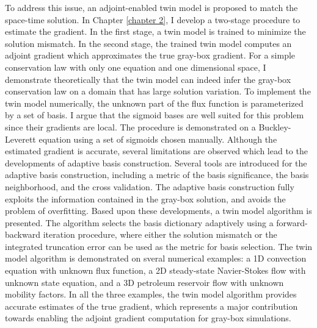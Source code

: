 To address this issue, an adjoint-enabled twin model is proposed 
to match the space-time solution.
In Chapter \ref{chapter 2}, I develop a two-stage procedure to estimate the gradient.
In the first stage, a twin model is trained to minimize the solution mismatch.
In the second stage, the trained twin model
computes an adjoint gradient which approximates the true gray-box gradient.
For a simple conservation law with only one equation and one dimensional space,
I demonstrate theoretically that the twin model can indeed infer the gray-box 
conservation law on a domain that has large solution variation.
To implement the twin model numerically,
the unknown part of the flux function is parameterized by a set of basis.
I argue that the sigmoid bases are well suited for this problem since
their gradients are local. The procedure is demonstrated
on a Buckley-Leverett equation using a set of sigmoids chosen manually.
Although the estimated gradient is accurate, several limitations are observed
which lead to the developments of adaptive basis construction.
Several tools are introduced for the adaptive basis construction,
including a metric of the basis significance, the basis neighborhood, 
and the cross validation.
The adaptive basis construction 
fully exploits the information contained in the
gray-box solution, and avoids the problem of overfitting.
Based upon these developments, a twin model algorithm is presented.
The algorithm selects the basis dictionary adaptively using a forward-backward iteration
procedure, where either the solution mismatch or the integrated truncation error
can be used as the metric for basis selection.
The twin model algorithm is demonstrated on 
sveral numerical examples:
a 1D convection equation with unknown 
flux function, a 2D steady-state Navier-Stokes flow with unknown state equation,
and a 3D petroleum reservoir flow with unknown mobility factors.
In all the three examples, the twin model algorithm provides accurate estimates
of the true gradient, which represents a major contribution towards enabling the
adjoint gradient computation for gray-box simulations.\\

